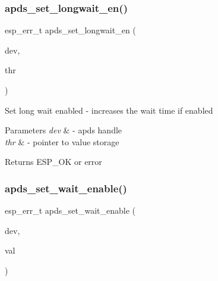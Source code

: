\subsubsection{\texorpdfstring{apds\+\_\+set\+\_\+longwait\+\_\+en()}{apds\_set\_longwait\_en()}}
{\footnotesize\ttfamily esp\+\_\+err\+\_\+t apds\+\_\+set\+\_\+longwait\+\_\+en (\begin{DoxyParamCaption}\item[{\hyperlink{structAPDS9960__Driver}{A\+P\+D\+S\+\_\+\+D\+EV}}]{dev,  }\item[{\hyperlink{vl53l0x__types_8h_aba7bc1797add20fe3efdf37ced1182c5}{uint8\+\_\+t} $\ast$}]{thr }\end{DoxyParamCaption})}




\begin{DoxyItemize}
\item Set long wait enabled -\/ increases the wait time if enabled 
\end{DoxyItemize}


\begin{DoxyParams}{Parameters}
{\em dev} & -\/ apds handle \\
\hline
{\em thr} & -\/ pointer to value storage \\
\hline
\end{DoxyParams}
\begin{DoxyReturn}{Returns}
E\+S\+P\+\_\+\+OK or error 
\end{DoxyReturn}
\mbox{\label{group__APDS9960__GeneralFunctions_ga2472490688d4bd0d2f999e2c8eee99b3}} 
\subsubsection{\texorpdfstring{apds\+\_\+set\+\_\+wait\+\_\+enable()}{apds\_set\_wait\_enable()}}
{\footnotesize\ttfamily esp\+\_\+err\+\_\+t apds\+\_\+set\+\_\+wait\+\_\+enable (\begin{DoxyParamCaption}\item[{\hyperlink{structAPDS9960__Driver}{A\+P\+D\+S\+\_\+\+D\+EV}}]{dev,  }\item[{\hyperlink{vl53l0x__types_8h_aba7bc1797add20fe3efdf37ced1182c5}{uint8\+\_\+t} $\ast$}]{val }\end{DoxyParamCaption})}




